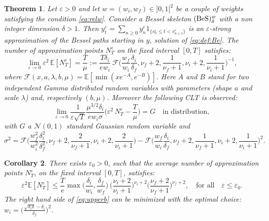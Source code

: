 \documentclass[12pt]{article}
\newcommand{\ds}{\displaystyle}
\newtheorem{thm}{Theorem}[section]
\newtheorem{corollary}[thm]{Corollary}
\numberwithin{equation}{section}
\begin{document}
\begin{thm}\label{thm:Bessne}
Let $\varepsilon>0$ and let $w=(w_i,w_f)\in]0,1[^2$ be a couple of weights satisfying the condition \eqref{eq:relw}. Consider a Bessel skeleton $({\rm BeS})_{\delta}^w$ with a non integer dimension $\delta>1$. Then $y^\varepsilon_t=\sum_{n\ge 0}y_n^\varepsilon1_{\{  s_n^\varepsilon \le t<s^\varepsilon_{n+1}\}}$ is an $\varepsilon$-strong approximation of the Bessel paths starting in $y$, solution of \eqref{eq:def:Be}. 
The number of approximation points $N_T^\varepsilon$ on the fixed interval $[0,T]$ satisfies:
\begin{equation}\label{eq:thm:2}
\lim_{\varepsilon\to 0}\varepsilon^2\,\mathbb{E}[N^\varepsilon_T]=\frac{T}{\mu}:=\frac{T\delta_i}{ew_i}\ \mathcal{F}\Big(\frac{w_f}{w_i}\frac{\delta_i}{\delta_f},\nu_f+2,\frac{1}{\nu_f+1},\nu_i+2,\frac{1}{\nu_i+1}\Big)^{-1},
\end{equation}
where $\mathcal{F}(x,a,\lambda,b,\mu)=\mathbb{E}[\min(x e^{-A},e^{-B})]$. Here $A$ and $B$ stand for two independent Gamma distributed random variables with parameters (shape $a$ and scale $\lambda$) and, respectively $(b,\mu)$. 
Moreover the following CLT is observed:
\[
\ds\lim_{\varepsilon \to 0}\frac{1}{\varepsilon\sqrt
T}\frac{\mu^{3/2}\delta_i}{ew_i\sigma}\Big(  \varepsilon^2\, N^\varepsilon_T-\frac{T}{\mu}\Big) = G \quad \mbox{in distribution},
\]
with $G$ a $\mathcal{N}(0,1)$ standard Gaussian random variable and 
\begin{equation}
\label{def:sigma2}
\sigma^2=\mathcal{F}\Big(\frac{w_f^2}{w_i^2}\frac{\delta_i^2}{\delta_f^2},\nu_f+2,\frac{2}{\nu_f+1},\nu_i+2,\frac{2}{\nu_i+1}\Big)-\mathcal{F}\Big(\frac{w_f}{w_i}\frac{\delta_i}{\delta_f},\nu_f+2,\frac{1}{\nu_f+1},\nu_i+2,\frac{1}{\nu_i+1}\Big)^2.
\end{equation}
\end{thm}
\begin{corollary}\label{cor:bessne} There exists $\varepsilon_0>0$, such that the average number of approximation points $N_T^\varepsilon$, on the fixed interval $[0,T]$, satisfies:
\begin{equation}\label{eq:upperb}
\varepsilon^2\mathbb{E}[N_T^\varepsilon]\le \frac{T}{e}\max\Big(\frac{\delta_i}{w_i},\frac{\delta_f}{w_f}\Big)\  \Big( \frac{\nu_i+2}{\nu_i+1} \Big)^{\nu_i+2}\Big( \frac{\nu_f+2}{\nu_f+1} \Big)^{\nu_f+2},\quad \mbox{for all}\quad \varepsilon\le \varepsilon_0.
\end{equation}
The right hand side of \eqref{eq:upperb} can be minimized with the optimal choice: $w_i=\Big( \frac{\sqrt{\delta_i\delta}-\delta_i}{\delta_f} \Big)^2$.
\end{corollary}
\end{document}
